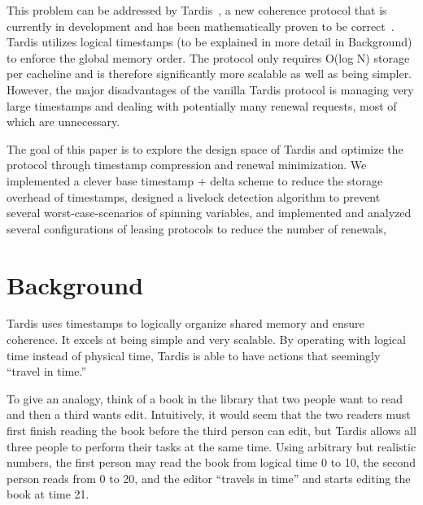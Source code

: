 \documentclass[12pt]{article}
\begin{document}
This problem can be addressed by Tardis~\cite{tardis}, a new coherence 
protocol that is currently in development and has been mathematically 
proven to be correct~\cite{tardis-proof}. Tardis utilizes logical 
timestamps (to be explained in more detail in Background) to enforce 
the global memory order. The protocol only requires O(log N) storage 
per cacheline and is therefore significantly more scalable as well as 
being simpler. However, the major disadvantages of the vanilla Tardis 
protocol is managing very large timestamps and dealing with 
potentially many renewal requests, most of which are unnecessary. 

The goal of this paper is to explore the design space of Tardis and 
optimize the protocol through timestamp compression and renewal 
minimization. We implemented a clever base timestamp + delta scheme to 
reduce the storage overhead of timestamps, designed a livelock 
detection algorithm to prevent several worst-case-scenarios of 
spinning variables, and implemented and analyzed several 
configurations of leasing protocols to reduce the number of renewals, 

\section{Background}

Tardis uses timestamps to logically organize shared memory and ensure 
coherence. It excels at being simple and very scalable. By operating 
with logical time instead of physical time, Tardis is able to have 
actions that seemingly “travel in time.” 

To give an analogy, think of a book in the library that two people 
want to read and then a third wants edit. Intuitively, it would seem 
that the two readers must first finish reading the book before the 
third person can edit, but Tardis allows all three people to perform 
their tasks at the same time.  Using arbitrary but realistic numbers, 
the first person may read the book from logical time 0 to 10, the 
second person reads from 0 to 20, and the editor “travels in time” and 
starts editing the book at time 21.
\end{document}
